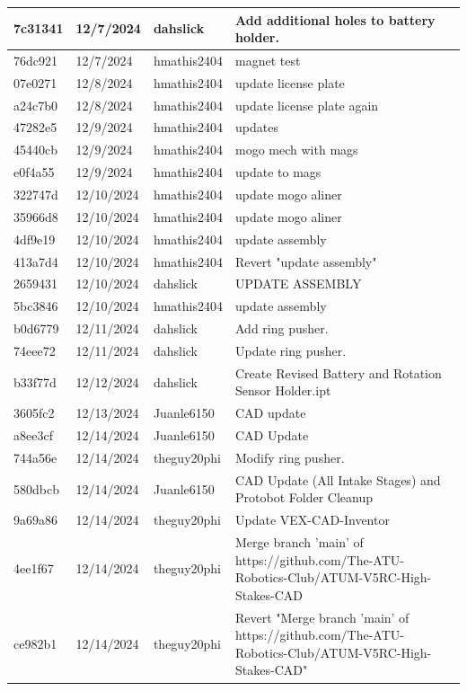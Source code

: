 \begin{center}
\begin{longtable}{|p{28pt}|p{33pt}|p{40pt}|p{300pt}|}
\hline
7c31341 & 12/7/2024 & dahslick & Add additional holes to battery holder. \\
\hline
76dc921 & 12/7/2024 & hmathis2404 & magnet test \\
\hline
07e0271 & 12/8/2024 & hmathis2404 & update license plate \\
\hline
a24c7b0 & 12/8/2024 & hmathis2404 & update license plate again \\
\hline
47282e5 & 12/9/2024 & hmathis2404 & updates \\
\hline
45440cb & 12/9/2024 & hmathis2404 & mogo mech with mags \\
\hline
e0f4a55 & 12/9/2024 & hmathis2404 & update to mags \\
\hline
322747d & 12/10/2024 & hmathis2404 & update mogo aliner \\
\hline
35966d8 & 12/10/2024 & hmathis2404 & update mogo aliner \\
\hline
4df9e19 & 12/10/2024 & hmathis2404 & update assembly \\
\hline
413a7d4 & 12/10/2024 & hmathis2404 & Revert "update assembly" \\
\hline
2659431 & 12/10/2024 & dahslick & UPDATE ASSEMBLY \\
\hline
5bc3846 & 12/10/2024 & hmathis2404 & update assembly \\
\hline
b0d6779 & 12/11/2024 & dahslick & Add ring pusher. \\
\hline
74eee72 & 12/11/2024 & dahslick & Update ring pusher. \\
\hline
b33f77d & 12/12/2024 & dahslick & Create Revised Battery and Rotation Sensor Holder.ipt \\
\hline
3605fc2 & 12/13/2024 & Juanle6150 & CAD update \\
\hline
a8ee3cf & 12/14/2024 & Juanle6150 & CAD Update \\
\hline
744a56e & 12/14/2024 & theguy20phi & Modify ring pusher. \\
\hline
580dbcb & 12/14/2024 & Juanle6150 & CAD Update (All Intake Stages) and Protobot Folder Cleanup \\
\hline
9a69a86 & 12/14/2024 & theguy20phi & Update VEX-CAD-Inventor \\
\hline
4ee1f67 & 12/14/2024 & theguy20phi & Merge branch 'main' of https://github.com/The-ATU-Robotics-Club/ATUM-V5RC-High-Stakes-CAD \\
\hline
ce982b1 & 12/14/2024 & theguy20phi & Revert "Merge branch 'main' of https://github.com/The-ATU-Robotics-Club/ATUM-V5RC-High-Stakes-CAD" \\

\end{longtable}
\end{center}
